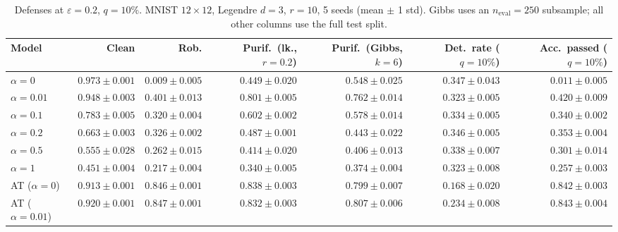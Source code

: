 \begin{table}[htbp]
  \centering
  \small
  \begin{tabular}{@{}lrrrrrr@{}}
    \toprule
    Model & Clean & Rob. & Purif.\ (lk., $r{=}0.2$) & Purif.\ (Gibbs, $k{=}6$) & Det.\ rate ($q{=}10\%$) & Acc.\ passed ($q{=}10\%$) \\
    \midrule
    $\alpha{=}0$ & $\mathbf{0.973 \pm 0.001}$ & $0.009 \pm 0.005$ & $0.449 \pm 0.020$ & $0.548 \pm 0.025$ & $\mathbf{0.347 \pm 0.043}$ & $0.011 \pm 0.005$ \\
    $\alpha{=}0.01$ & $0.948 \pm 0.003$ & $0.401 \pm 0.013$ & $0.801 \pm 0.005$ & $0.762 \pm 0.014$ & $0.323 \pm 0.005$ & $0.420 \pm 0.009$ \\
    $\alpha{=}0.1$ & $0.783 \pm 0.005$ & $0.320 \pm 0.004$ & $0.602 \pm 0.002$ & $0.578 \pm 0.014$ & $0.334 \pm 0.005$ & $0.340 \pm 0.002$ \\
    $\alpha{=}0.2$ & $0.663 \pm 0.003$ & $0.326 \pm 0.002$ & $0.487 \pm 0.001$ & $0.443 \pm 0.022$ & $0.346 \pm 0.005$ & $0.353 \pm 0.004$ \\
    $\alpha{=}0.5$ & $0.555 \pm 0.028$ & $0.262 \pm 0.015$ & $0.414 \pm 0.020$ & $0.406 \pm 0.013$ & $0.338 \pm 0.007$ & $0.301 \pm 0.014$ \\
    $\alpha{=}1$ & $0.451 \pm 0.004$ & $0.217 \pm 0.004$ & $0.340 \pm 0.005$ & $0.374 \pm 0.004$ & $0.323 \pm 0.008$ & $0.257 \pm 0.003$ \\
    AT ($\alpha{=}0$) & $0.913 \pm 0.001$ & $0.846 \pm 0.001$ & $\mathbf{0.838 \pm 0.003}$ & $0.799 \pm 0.007$ & $0.168 \pm 0.020$ & $0.842 \pm 0.003$ \\
    AT ($\alpha{=}0.01$) & $0.920 \pm 0.001$ & $\mathbf{0.847 \pm 0.001}$ & $0.832 \pm 0.003$ & $\mathbf{0.807 \pm 0.006}$ & $0.234 \pm 0.008$ & $\mathbf{0.843 \pm 0.004}$ \\
    \bottomrule
  \end{tabular}
  \caption{Defenses at $\varepsilon=0.2$, $q{=}10\%$. MNIST $12\times12$, Legendre $d{=}3$, $r{=}10$, 5 seeds (mean $\pm$ 1 std). Gibbs uses an $n_{\mathrm{eval}}=250$ subsample; all other columns use the full test split.}
  \label{tab:mnist_r12_models_r10_eps0.2}
\end{table}
